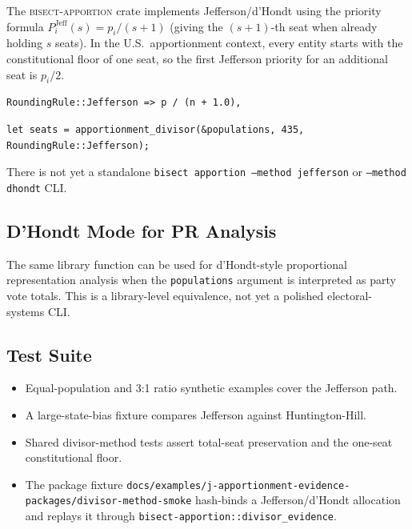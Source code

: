 \label{sec:implementation}

The \textsc{bisect-apportion} crate implements Jefferson/d'Hondt
using the priority formula $P_i^{\text{Jeff}}(s) = p_i/(s+1)$
(giving the $(s+1)$-th seat when already holding $s$ seats).
In the U.S.\ apportionment context, every entity starts with the constitutional
floor of one seat, so the first Jefferson priority for an additional seat is
$p_i/2$.

\begin{verbatim}
RoundingRule::Jefferson => p / (n + 1.0),
\end{verbatim}

\begin{verbatim}
let seats = apportionment_divisor(&populations, 435, RoundingRule::Jefferson);
\end{verbatim}

There is not yet a standalone \texttt{bisect apportion --method jefferson} or
\texttt{--method dhondt} CLI.

\subsection{D'Hondt Mode for PR Analysis}

The same library function can be used for d'Hondt-style proportional
representation analysis when the \texttt{populations} argument is interpreted as
party vote totals.  This is a library-level equivalence, not yet a polished
electoral-systems CLI.

\subsection{Test Suite}

\begin{itemize}
  \item Equal-population and 3:1 ratio synthetic examples cover the Jefferson path.
  \item A large-state-bias fixture compares Jefferson against Huntington-Hill.
  \item Shared divisor-method tests assert total-seat preservation and the
    one-seat constitutional floor.
  \item The package fixture
    \texttt{docs/examples/j-apportionment-evidence-packages/divisor-method-smoke}
    hash-binds a Jefferson/d'Hondt allocation and replays it through
    \texttt{bisect-apportion::divisor\_evidence}.
\end{itemize}
